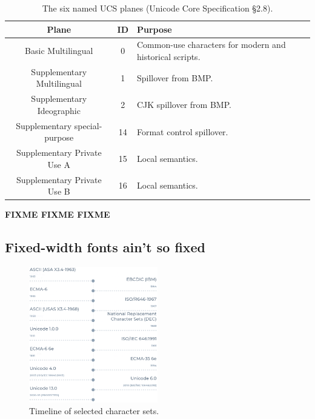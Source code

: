 \documentclass[letterpaper,10pt]{article}
\begin{document}
\begin{table}[!htb]
  \begin{center}
    \begin{tabular}{ |c|c|p{}| }
      \hline
      Plane & ID & Purpose \\
      \hline
      \hline
      Basic Multilingual & 0 & Common-use characters for modern and historical scripts. \\
      \hline
      Supplementary Multilingual & 1 & Spillover from BMP. \\
      \hline
      Supplementary Ideographic & 2 & CJK spillover from BMP. \\
      \hline
      Supplementary special-purpose & 14 & Format control spillover. \\
      \hline
      Supplementary Private Use A & 15 & Local semantics. \\
      \hline
      Supplementary Private Use B & 16 & Local semantics. \\
      \hline
    \end{tabular}
  \end{center}
  \caption[The six named UCS planes.]{The six named UCS planes (Unicode Core Specification §2.8\cite{unicode}).}
  \label{table:ucsplanes}
\end{table}

\textbf{FIXME FIXME FIXME}

\subsection{Fixed-width fonts ain't so fixed}

\begin{figure}
\centering
\includegraphics[width=0.5\textwidth]{media/charset-timeline.png}
\caption{Timeline of selected character sets.}
\label{fig:charset-timeline}
\end{figure}
\end{document}
